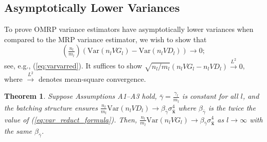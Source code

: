 \documentclass[12pt]{article}
\newtheorem{theorem}{Theorem}
\newcommand{\var}[1]{\mathrm{Var} \left( #1 \right)}
\newcommand{\x}{\mathbf{x}}
\newcommand{\xh}{{\hat{\x}}}
\newcommand{\gammab}{\bar{\gamma}}
\begin{document}
\subsection{Asymptotically Lower Variances}
\label{ssec:var_reduct}

 
To prove OMRP variance estimators have asymptotically lower variances when compared to the MRP variance estimator, we wish to show that 
$$
(\tfrac{n_l}{m_l}) \left( \var{n_l VG_l} - \var{n_l VD_l} \right) \rightarrow 0;
$$
see, e.g., (\ref{eq:varvarred}).
It suffices to show $\sqrt{{n_l}/{m_l}} \left( n_l VG_l - n_l VD_l \right) \xrightarrow{L^2} 0$, where $\xrightarrow{L^2}$ denotes mean-square convergence.


\begin{theorem} \label{thm:varvar_conv}
	Suppose Assumptions A1--A3 hold, $\gammab = \frac{\gamma_l}{m_l}$ is constant for all $l$, and the batching structure ensures  $\frac{n_l}{m_l}\var{n_l VD_l} \rightarrow \beta_{\gammab} \sigma^4_{\xh}$ where $\beta_{\gammab}$ is the twice the value of (\ref{eq:var_reduct_formula}). 
        Then, $\frac{n_l}{m_l}\var{n_l VG_l} \rightarrow \beta_{\gammab} \sigma^4_{\xh}$ as $l \rightarrow \infty$ with the same $\beta_{\gammab}$. 
\end{theorem}
\end{document}
